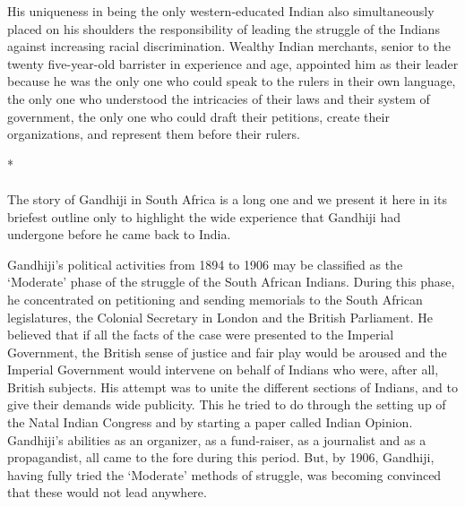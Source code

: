 His uniqueness in being the only western-educated Indian also simultaneously placed on his shoulders the responsibility of leading the struggle of the Indians against increasing racial discrimination. Wealthy Indian merchants, senior to the twenty­ five-year-old barrister in experience and age, appointed him as their leader because he was the only one who could speak to the rulers in their own language, the only one who understood the intricacies of their laws and their system of government, the only one who could draft their petitions, create their organizations, and represent them before their rulers.

\begin{center}*\end{center}

\paragraph*{}


The story of Gandhiji in South Africa is a long one and we present it here in its briefest outline only to highlight the wide experience that Gandhiji had undergone before he came back to India.

Gandhiji's political activities from 1894 to 1906 may be classified as the `Moderate' phase of the struggle of the South African Indians. During this phase, he concentrated on petitioning and sending memorials to the South African legislatures, the Colonial Secretary in London and the British Parliament. He believed that if all the facts of the case were presented to the Imperial Government, the British sense of justice and fair play would be aroused and the Imperial Government would intervene on behalf of Indians who were, after all, British subjects. His attempt was to unite the different sections of Indians, and to give their demands wide publicity. This he tried to do through the setting up of the Natal Indian Congress and by starting a paper called Indian Opinion. Gandhiji's abilities as an organizer, as a fund-raiser, as a journalist and as a propagandist, all came to the fore during this period. But, by 1906, Gandhiji, having fully tried the `Moderate' methods of struggle, was becoming convinced that these would not lead anywhere.

